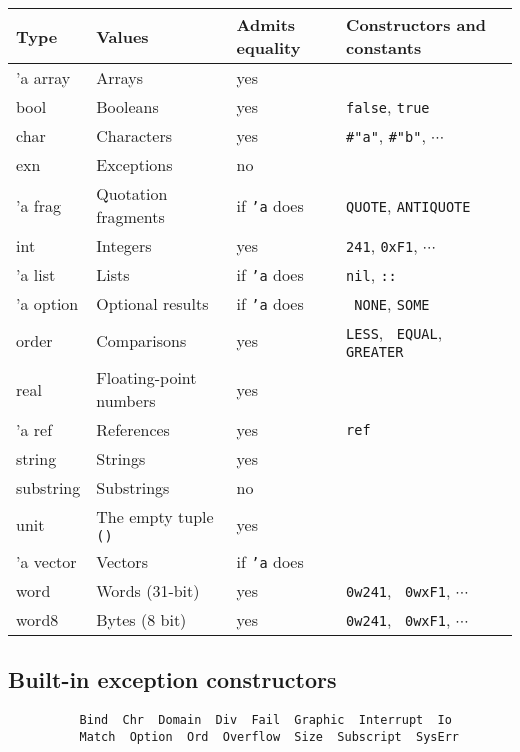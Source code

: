 \documentclass[fleqn,a4paper]{article}
\begin{document}
\begin{tabular}{@{\tt\ \ }llll}\hline

{\rm Type} & Values & Admits equality & Constructors and constants\\\hline
'a array    & Arrays                  &  yes \\
bool        & Booleans                &  yes  & {\tt false}, {\tt true}\\
char        & Characters              &  yes & \verb$#"a"$,
    \verb$#"b"$, $\cdots$\\ 
exn         & Exceptions              &  no\\
'a frag     & Quotation fragments     &  if {\tt 'a} does 
& {\tt QUOTE}, {\tt ANTIQUOTE}\\
int         & Integers                & yes & {\tt 241}, {\tt 0xF1}, $\cdots$\\
'a list     & Lists                   &  if {\tt 'a} does & {\tt nil},
    {\tt ::}\\ 
'a option   & Optional results        &  if {\tt 'a} does & {\tt
  NONE}, {\tt SOME}\\ 
order       & Comparisons  &  yes  & {\tt LESS}, {\tt
  EQUAL}, {\tt GREATER}\\
real        & Floating-point numbers  &  yes\\
'a ref      & References              &  yes            & {\tt ref}\\
string      & Strings                 &  yes\\
substring   & Substrings              &  no\\
unit        & The empty tuple {\tt ()}    & yes \\
'a vector   & Vectors                 &  if {\tt 'a} does \\
word        & Words (31-bit)          &  yes & {\tt 0w241}, {\tt
  0wxF1}, $\cdots$ \\
word8       & Bytes (8 bit)           &  yes & {\tt 0w241}, {\tt
  0wxF1}, $\cdots$ \\\hline 
\end{tabular}


\subsection*{Built-in exception constructors}

\begin{verbatim}
          Bind  Chr  Domain  Div  Fail  Graphic  Interrupt  Io
          Match  Option  Ord  Overflow  Size  Subscript  SysErr
\end{verbatim}
\end{document}
